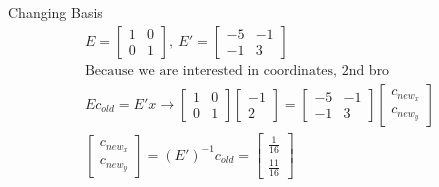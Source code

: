 \documentclass[aspectratio=169]{beamer}
\begin{document}
\begin{frame}[t]{Changing Basis}
{    \begin{align*}
        E = \begin{bmatrix}
        1 & 0\\ 
        0 & 1 
        \end{bmatrix},\ E' = \begin{bmatrix}
        -5 & -1\\ 
        -1 & 3 
        \end{bmatrix} \\
        \text{Because we are interested in coordinates, 2nd bro} \\
        Ec_{old} = E'x \rightarrow \begin{bmatrix}
            1 & 0\\ 
            0 & 1 
            \end{bmatrix}\begin{bmatrix} -1\\ 2 \end{bmatrix} = \begin{bmatrix}
            -5 & -1\\ 
            -1 & 3 
            \end{bmatrix}\begin{bmatrix} c_{new_x}\\c_{new_y} \end{bmatrix} \\
            \begin{bmatrix} c_{new_x}\\c_{new_y} \end{bmatrix} = (E')^{-1}c_{old} = \begin{bmatrix} \frac{1}{16}\\ \frac{11}{16} \end{bmatrix}
    \end{align*}
    }
\end{frame}
\end{document}
